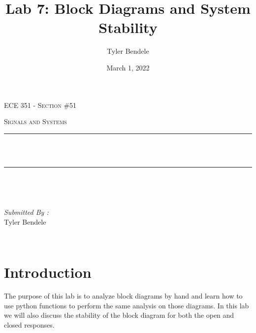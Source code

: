 \documentclass[12pt]{report}
\title{Lab 7: Block Diagrams and System Stability}
\author{Tyler Bendele}
\date{March 1, 2022}
\makeatletter
\let\thetitle\@title
\makeatother
\begin{document}
\begin{titlepage}
\centering
\vspace*{0.5 cm}

\begin{center}    \textsc{\Large   ECE 351 - Section \#51 }\\[2.0 cm]
\end{center}%
\textsc{\Large Signals and Systems  }\\[0.5 cm] %

\rule{\linewidth}{0.2 mm} \\[0.4 cm]
{ \huge \bfseries \thetitle}\\
\rule{\linewidth}{0.2 mm} \\[1.5 cm]
\begin{minipage}{0.4\textwidth}
\begin{flushleft} \large
\end{flushleft}
\end{minipage}~
\begin{minipage}{0.4\textwidth}
\begin{flushright} \large
\emph{Submitted By :} \\
Tyler Bendele
\end{flushright}
\end{minipage}\\[2 cm]
\end{titlepage}
\tableofcontents
\pagebreak
\renewcommand{\thesection}{\arabic{section}}
\section{Introduction}
The purpose of this lab is to analyze block diagrams by hand and learn how
to use python functions to perform the same analysis on those diagrams.
In this lab we will also discuss the stability of the block diagram
for both the open and closed responses.
\end{document}
